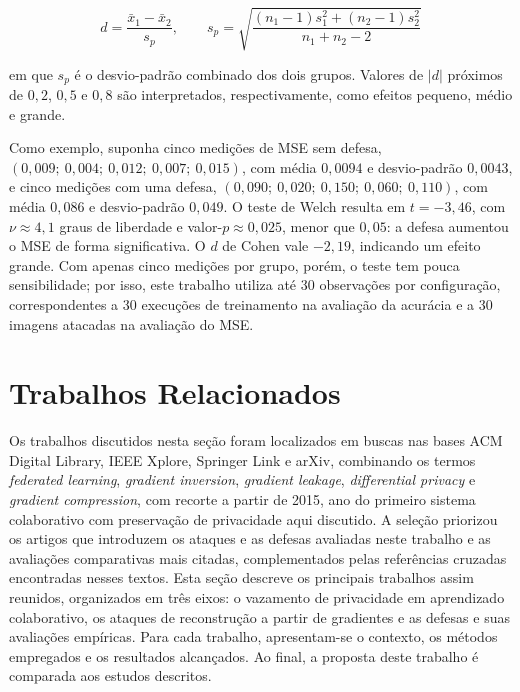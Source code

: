 \begin{equation} \label{eq:cohen}
d = \frac{\bar{x}_1 - \bar{x}_2}{s_p}, \qquad s_p = \sqrt{\frac{(n_1 - 1)s_1^2 + (n_2 - 1)s_2^2}{n_1 + n_2 - 2}}
\end{equation}

\noindent em que $s_p$ é o desvio-padrão combinado dos dois grupos. Valores de $|d|$ próximos de $0{,}2$, $0{,}5$ e $0{,}8$ são interpretados, respectivamente, como efeitos pequeno, médio e grande.

Como exemplo, suponha cinco medições de MSE sem defesa, $(0{,}009;\ 0{,}004;\ 0{,}012;\ 0{,}007;\ 0{,}015)$, com média $0{,}0094$ e desvio-padrão $0{,}0043$, e cinco medições com uma defesa, $(0{,}090;\ 0{,}020;\ 0{,}150;\ 0{,}060;\ 0{,}110)$, com média $0{,}086$ e desvio-padrão $0{,}049$. O teste de Welch resulta em $t = -3{,}46$, com $\nu \approx 4{,}1$ graus de liberdade e valor-$p \approx 0{,}025$, menor que $0{,}05$: a defesa aumentou o MSE de forma significativa. O $d$ de Cohen vale $-2{,}19$, indicando um efeito grande. Com apenas cinco medições por grupo, porém, o teste tem pouca sensibilidade; por isso, este trabalho utiliza até 30 observações por configuração, correspondentes a 30 execuções de treinamento na avaliação da acurácia e a 30 imagens atacadas na avaliação do MSE.

\section{Trabalhos Relacionados} \label{sec:relacionados}

Os trabalhos discutidos nesta seção foram localizados em buscas nas bases ACM Digital Library, IEEE Xplore, Springer Link e arXiv, combinando os termos \textsl{federated learning}, \textsl{gradient inversion}, \textsl{gradient leakage}, \textsl{differential privacy} e \textsl{gradient compression}, com recorte a partir de 2015, ano do primeiro sistema colaborativo com preservação de privacidade aqui discutido. A seleção priorizou os artigos que introduzem os ataques e as defesas avaliadas neste trabalho e as avaliações comparativas mais citadas, complementados pelas referências cruzadas encontradas nesses textos. Esta seção descreve os principais trabalhos assim reunidos, organizados em três eixos: o vazamento de privacidade em aprendizado colaborativo, os ataques de reconstrução a partir de gradientes e as defesas e suas avaliações empíricas. Para cada trabalho, apresentam-se o contexto, os métodos empregados e os resultados alcançados. Ao final, a proposta deste trabalho é comparada aos estudos descritos.

